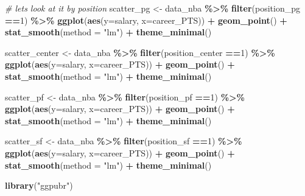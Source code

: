 \documentclass[
]{book}
\newenvironment{Shaded}{\begin{snugshade}}{\end{snugshade}}
\newcommand{\AttributeTok}[1]{\textcolor[rgb]{0.13,0.29,0.53}{#1}}
\newcommand{\CommentTok}[1]{\textcolor[rgb]{0.56,0.35,0.01}{\textit{#1}}}
\newcommand{\DecValTok}[1]{\textcolor[rgb]{0.00,0.00,0.81}{#1}}
\newcommand{\FunctionTok}[1]{\textcolor[rgb]{0.13,0.29,0.53}{\textbf{#1}}}
\newcommand{\NormalTok}[1]{#1}
\newcommand{\OtherTok}[1]{\textcolor[rgb]{0.56,0.35,0.01}{#1}}
\newcommand{\SpecialCharTok}[1]{\textcolor[rgb]{0.81,0.36,0.00}{\textbf{#1}}}
\newcommand{\StringTok}[1]{\textcolor[rgb]{0.31,0.60,0.02}{#1}}
\begin{document}
\begin{Shaded}
\begin{Highlighting}[]
\CommentTok{\# let\textquotesingle{}s look at it by position}
\NormalTok{scatter\_pg }\OtherTok{\textless{}{-}}\NormalTok{ data\_nba }\SpecialCharTok{\%\textgreater{}\%} \FunctionTok{filter}\NormalTok{(position\_pg }\SpecialCharTok{==}\DecValTok{1}\NormalTok{) }\SpecialCharTok{\%\textgreater{}\%}
  \FunctionTok{ggplot}\NormalTok{(}\FunctionTok{aes}\NormalTok{(}\AttributeTok{y=}\NormalTok{salary, }\AttributeTok{x=}\NormalTok{career\_PTS)) }\SpecialCharTok{+}
    \FunctionTok{geom\_point}\NormalTok{() }\SpecialCharTok{+} 
     \FunctionTok{stat\_smooth}\NormalTok{(}\AttributeTok{method =} \StringTok{"lm"}\NormalTok{) }\SpecialCharTok{+} 
       \FunctionTok{theme\_minimal}\NormalTok{()}

\NormalTok{scatter\_center }\OtherTok{\textless{}{-}}\NormalTok{ data\_nba }\SpecialCharTok{\%\textgreater{}\%} \FunctionTok{filter}\NormalTok{(position\_center }\SpecialCharTok{==}\DecValTok{1}\NormalTok{) }\SpecialCharTok{\%\textgreater{}\%}
  \FunctionTok{ggplot}\NormalTok{(}\FunctionTok{aes}\NormalTok{(}\AttributeTok{y=}\NormalTok{salary, }\AttributeTok{x=}\NormalTok{career\_PTS)) }\SpecialCharTok{+}
    \FunctionTok{geom\_point}\NormalTok{() }\SpecialCharTok{+} 
     \FunctionTok{stat\_smooth}\NormalTok{(}\AttributeTok{method =} \StringTok{"lm"}\NormalTok{) }\SpecialCharTok{+} 
       \FunctionTok{theme\_minimal}\NormalTok{()}

\NormalTok{scatter\_pf }\OtherTok{\textless{}{-}}\NormalTok{ data\_nba }\SpecialCharTok{\%\textgreater{}\%} \FunctionTok{filter}\NormalTok{(position\_pf }\SpecialCharTok{==}\DecValTok{1}\NormalTok{) }\SpecialCharTok{\%\textgreater{}\%}
  \FunctionTok{ggplot}\NormalTok{(}\FunctionTok{aes}\NormalTok{(}\AttributeTok{y=}\NormalTok{salary, }\AttributeTok{x=}\NormalTok{career\_PTS)) }\SpecialCharTok{+}
    \FunctionTok{geom\_point}\NormalTok{() }\SpecialCharTok{+} 
     \FunctionTok{stat\_smooth}\NormalTok{(}\AttributeTok{method =} \StringTok{"lm"}\NormalTok{) }\SpecialCharTok{+} 
       \FunctionTok{theme\_minimal}\NormalTok{()}

\NormalTok{scatter\_sf }\OtherTok{\textless{}{-}}\NormalTok{ data\_nba }\SpecialCharTok{\%\textgreater{}\%} \FunctionTok{filter}\NormalTok{(position\_sf }\SpecialCharTok{==}\DecValTok{1}\NormalTok{) }\SpecialCharTok{\%\textgreater{}\%}
  \FunctionTok{ggplot}\NormalTok{(}\FunctionTok{aes}\NormalTok{(}\AttributeTok{y=}\NormalTok{salary, }\AttributeTok{x=}\NormalTok{career\_PTS)) }\SpecialCharTok{+}
    \FunctionTok{geom\_point}\NormalTok{() }\SpecialCharTok{+} 
     \FunctionTok{stat\_smooth}\NormalTok{(}\AttributeTok{method =} \StringTok{"lm"}\NormalTok{) }\SpecialCharTok{+} 
       \FunctionTok{theme\_minimal}\NormalTok{()}

\FunctionTok{library}\NormalTok{(}\StringTok{"ggpubr"}\NormalTok{)}
\end{Highlighting}
\end{Shaded}
\end{document}
